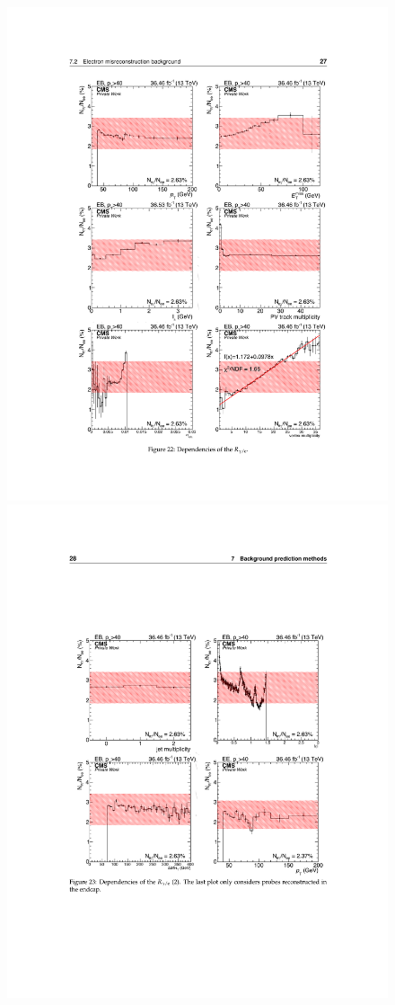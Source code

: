\begin{figure}[h]
\begin{center}
\includegraphics[width=\textwidth]{Figures/DataAnalysis/fakeKin3.pdf}
\includegraphics[width=\textwidth]{Figures/DataAnalysis/fakeKin2.pdf}

\end{center}
\end{figure}
